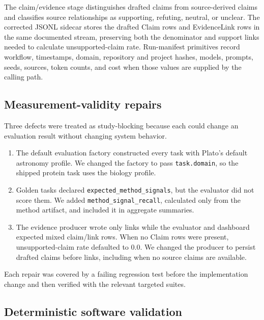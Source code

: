 \documentclass[11pt]{article}
\begin{document}
The claim/evidence stage distinguishes drafted claims from source-derived claims and classifies source relationships as supporting, refuting, neutral, or unclear. The corrected JSONL sidecar stores the drafted Claim rows and EvidenceLink rows in the same documented stream, preserving both the denominator and support links needed to calculate unsupported-claim rate. Run-manifest primitives record workflow, timestamps, domain, repository and project hashes, models, prompts, seeds, sources, token counts, and cost when those values are supplied by the calling path.

\subsection{Measurement-validity repairs}

Three defects were treated as study-blocking because each could change an evaluation result without changing system behavior.

\begin{enumerate}[leftmargin=*]

\item The default evaluation factory constructed every task with Plato's default astronomy profile. We changed the factory to pass \nolinkurl{task.domain}, so the shipped protein task uses the biology profile.

\item Golden tasks declared \nolinkurl{expected_method_signals}, but the evaluator did not score them. We added \nolinkurl{method_signal_recall}, calculated only from the method artifact, and included it in aggregate summaries.

\item The evidence producer wrote only links while the evaluator and dashboard expected mixed claim/link rows. When no Claim rows were present, unsupported-claim rate defaulted to 0.0. We changed the producer to persist drafted claims before links, including when no source claims are available.

\end{enumerate}

Each repair was covered by a failing regression test before the implementation change and then verified with the relevant targeted suites.

\subsection{Deterministic software validation}
\end{document}
